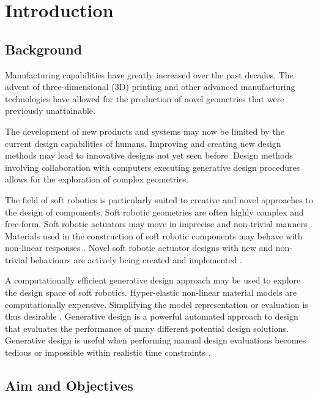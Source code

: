 \chapter{Introduction}
\label{chp:I}


\section{Background}

Manufacturing capabilities have greatly increased over the past decades. The advent of three-dimensional (3D) printing and other advanced manufacturing technologies have allowed for the production of novel geometries that were previously unattainable. \citep{Buchanan2019,Luis2020}

The development of new products and systems may now be limited by the current design capabilities of humans. Improving and creating new design methods may lead to innovative designs not yet seen before. Design methods involving collaboration with computers executing generative design procedures allows for the exploration of complex geometries. \citep{Shea2005}

The field of soft robotics is particularly suited to creative and novel approaches to the design of components. Soft robotic geometries are often highly complex and free-form. Soft robotic actuators may move in imprecise and non-trivial manners \citep{Whitesides2018}. Materials used in the construction of soft robotic components may behave with non-linear responses \citep{Boyraz2018}. Novel soft robotic actuator designs with new and non-trivial behaviours are actively being created and implemented \citep{Ellis2020}.

A computationally efficient generative design approach may be used to explore the design space of soft robotics. Hyper-elastic non-linear material models are computationally expensive. Simplifying the model representation or evaluation is thus desirable \citep{Niroomandi2010}. Generative design is a powerful automated approach to design that evaluates the performance of many different potential design solutions. Generative design is useful when performing manual design evaluations becomes tedious or impossible within realistic time constraints \citep{Brose1993}.

\section{Aim and Objectives}

